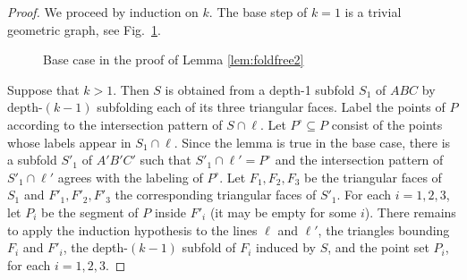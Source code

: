 \documentclass[reqno,12pt]{amsart}
\begin{document}
\begin{proof}
We proceed by induction on $k$. The base step of $k=1$ is a trivial
geometric graph, see Fig.~\ref{fig:basecase}.
\begin{figure}
\centering
\hfill
\hfill
\caption{Base case in the proof of Lemma \protect\ref{lem:foldfree2}}
\label{fig:basecase}
\end{figure}
Suppose that $k>1$. Then $S$ is obtained from a depth-1 subfold $S_1$ of $ABC$
by depth-$(k-1)$ subfolding each of its three triangular faces. Label
the points of $P$ according to the intersection pattern of $S\cap\ell$.
Let $P^\circ\subseteq P$ consist of the points whose labels appear in $S_1\cap\ell$.
Since the lemma is true in the base case, there is a subfold $S'_1$ of $A'B'C'$
such that $S'_1\cap\ell'=P^\circ$ and the intersection pattern of $S'_1\cap\ell'$
agrees with the labeling of $P^\circ$.
Let $F_1,F_2,F_3$ be the triangular faces of $S_1$ and $F'_1,F'_2,F'_3$
the corresponding triangular faces of $S'_1$.
For each $i=1,2,3$, let $P_i$ be the segment of $P$ inside $F'_i$
(it may be empty for some $i$). There remains to apply the induction hypothesis
to the lines $\ell$ and $\ell'$, the triangles bounding $F_i$ and $F'_i$,
the depth-$(k-1)$ subfold of $F_i$ induced by $S$, and the point set $P_i$,
for each $i=1,2,3$.
\end{proof}
\end{document}
